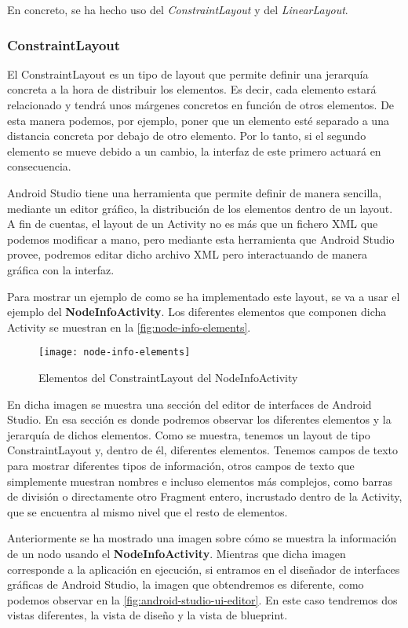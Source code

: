 En concreto, se ha hecho uso del \textit{ConstraintLayout} y del \textit{LinearLayout}.

\subsubsection{ConstraintLayout}

El ConstraintLayout es un tipo de layout que permite definir una jerarquía concreta a la hora de distribuir los elementos. Es decir, cada elemento estará relacionado y tendrá unos márgenes concretos en función de otros elementos. De esta manera podemos, por ejemplo, poner que un elemento esté separado a una distancia concreta por debajo de otro elemento. Por lo tanto, si el segundo elemento se mueve debido a un cambio, la interfaz de este primero actuará en consecuencia.

Android Studio tiene una herramienta que permite definir de manera sencilla, mediante un editor gráfico, la distribución de los elementos dentro de un layout. A fin de cuentas, el layout de un Activity no es más que un fichero XML que podemos modificar a mano, pero mediante esta herramienta que Android Studio provee, podremos editar dicho archivo XML pero interactuando de manera gráfica con la interfaz.

Para mostrar un ejemplo de como se ha implementado este layout, se va a usar el ejemplo del \textbf{NodeInfoActivity}. Los diferentes elementos que componen dicha Activity se muestran en la \autoref{fig:node-info-elements}.

\begin{figure}[H]
	\centering
	\texttt{[image: node-info-elements]}
	\caption{Elementos del ConstraintLayout del NodeInfoActivity}
	\label{fig:node-info-elements}
\end{figure}

En dicha imagen se muestra una sección del editor de interfaces de Android Studio. En esa sección es donde podremos observar los diferentes elementos y la jerarquía de dichos elementos. Como se muestra, tenemos un layout de tipo ConstraintLayout y, dentro de él, diferentes elementos. Tenemos campos de texto para mostrar diferentes tipos de información, otros campos de texto que simplemente muestran nombres e incluso elementos más complejos, como barras de división o directamente otro Fragment entero, incrustado dentro de la Activity, que se encuentra al mismo nivel que el resto de elementos.

Anteriormente se ha mostrado una imagen sobre cómo se muestra la información de un nodo usando el \textbf{NodeInfoActivity}. Mientras que dicha imagen corresponde a la aplicación en ejecución, si entramos en el diseñador de interfaces gráficas de Android Studio, la imagen que obtendremos es diferente, como podemos observar en la \autoref{fig:android-studio-ui-editor}. En este caso tendremos dos vistas diferentes, la vista de diseño y la vista de blueprint. 

